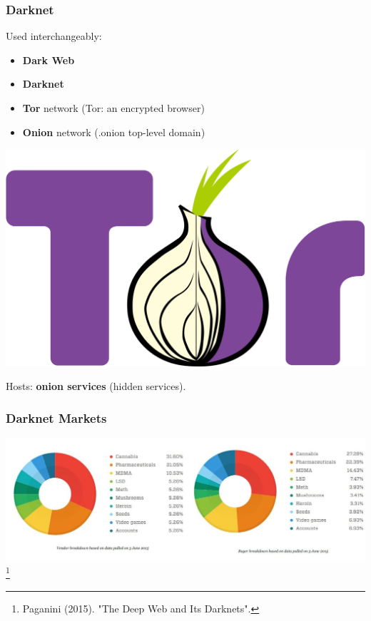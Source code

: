 \documentclass[t,xcolor={svgnames,table}]{beamer}
\begin{document}
\begin{frame}
	\frametitle{Darknet}
	
	Used interchangeably:
	
	\begin{minipage}{.6\pagewidth}
	\begin{itemize}
	\item \textbf{Dark Web}
	\item \textbf{Darknet}
	\item \textbf{Tor} network (Tor: an encrypted browser)
	\item \textbf{Onion} network (.onion top-level domain)
	\end{itemize}
	\end{minipage}
	\begin{minipage}{.3\pagewidth}
	\includegraphics[width=.3\pagewidth]{Tor.png}
	\end{minipage}
	\vfill
	
	Hosts: \textbf{onion services} (hidden services).
\end{frame}

\begin{frame}
	\frametitle{Darknet Markets}
	
	\includegraphics[trim={0 2cm 16cm 1cm},clip,width=\pagewidth]{DeepWeb-Black-markets-vendors-buyers.jpg}\footnote{Paganini (2015). "The Deep Web and Its Darknets".}
\end{frame}
\end{document}
